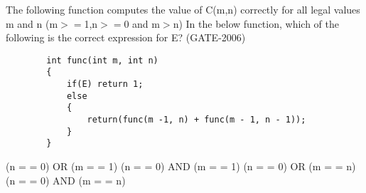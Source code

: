 

\begin{questyle}
  \question  The following function computes the value of C(m,n) correctly for all legal values m and n (m\(>=\)1,n\(>=\)0 and m\(>\)n)
            In the below function, which of the following is the correct expression for E? (GATE-2006)

    \begin{lstlisting}
        int func(int m, int n)
        {
            if(E) return 1;
            else
            {
                return(func(m -1, n) + func(m - 1, n - 1));
            }
        }
    \end{lstlisting}

  \begin{choices}
    \choice         (n = = 0) OR  (m = = 1)
    \choice         (n = = 0) AND (m = = 1)
    \CorrectChoice  (n = = 0) OR  (m = = n)
    \choice         (n = = 0) AND (m = = n)
  \end{choices}
\end{questyle}
